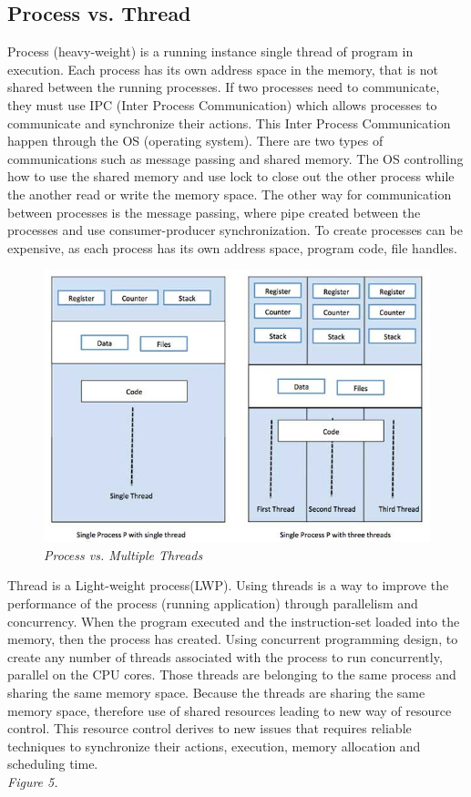 \documentclass[12pt]{article}
\begin{document}
\subsection{Process vs. Thread}
Process (heavy-weight) is a running instance single thread of program in execution. Each process has its own address space in the memory, that is not shared between the running processes. If two processes need to communicate, they must use IPC (Inter Process Communication) which allows processes to communicate and synchronize their actions. This Inter Process Communication happen through the OS (operating system). There are two types of communications such as message passing and shared memory. The OS controlling how to use the shared memory and use lock to close out the other process while the another read or write the memory space. The other way for communication between processes is the message passing, where pipe created between the processes and use consumer-producer synchronization. To create processes can be expensive, as each process has its own address space, program code, file handles.\\

\begin{figure}[h!]
\centering
\includegraphics[scale=0.5]{Pictures/single_multi_thread.png}
\caption{\textit{\color{gray}Process vs. Multiple Threads \cite{Nikolay}}}
\end{figure}

Thread is a Light-weight process(LWP). Using threads is a way to improve the performance of the process (running application) through parallelism and concurrency. When the program executed and the instruction-set loaded into the memory, then the process has created. Using concurrent programming design, to create any number of threads associated with the process to run concurrently, parallel on the CPU cores. Those threads are belonging to the same process and sharing the same memory space. Because the threads are sharing the same memory space, therefore use of shared resources leading to new way of resource control. This resource control derives to new issues that requires reliable techniques to synchronize their actions, execution, memory allocation and scheduling time.\cite{Tutorialspoint}\\\textit{\color{gray}Figure 5.}\\\\
 
\end{document}
